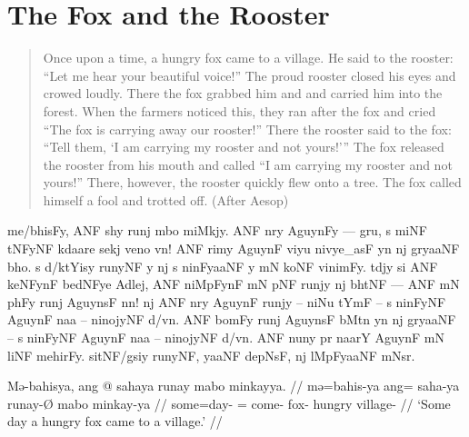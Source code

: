 \section{The Fox and the Rooster}
\label{sec:foxrooster}

\citep[Adapted from][]{becker:uebersetzungsaufgabe}\medskip

\blockquote{Once upon a time, a hungry fox came to a village. He said to the
rooster: \enquote{Let me hear your beautiful voice!} The proud rooster closed
his eyes and crowed loudly. There the fox grabbed him and and carried him into
the forest. When the farmers noticed this, they ran after the fox and cried
\enquote{The fox is carrying away our rooster!} There the rooster said to the
fox: \enquote{Tell them, \enquote{I am carrying my rooster and not yours!}} The
fox released the rooster from his mouth and called \enquote{I am carrying my
rooster and not yours!} There, however, the rooster quickly flew onto a tree.
The fox called himself a fool and trotted off. (After Aesop)}

\begin{flushleft}
\Tagati me/bhisFy, ANF shy runj mbo miMkjy. ANF nry AguynFy — gru, s
miNF tNFyNF kdaare sekj veno vn! ANF rimy AguynF viyu nivye\_asF yn nj gryaaNF
bho. s d/ktYisy runyNF y nj s ninFyaaNF y mN koNF vinimFy. tdjy si ANF keNFynF
bedNFye Adlej, ANF niMpFynF mN pNF runjy nj bhtNF — ANF mN phFy runj AguynsF
nn! nj ANF nry AguynF runjy – niNu tYmF – s ninFyNF AguynF naa – ninojyNF
d/vn. ANF bomFy runj AguynsF bMtn yn nj gryaaNF – s ninFyNF AguynF naa –
ninojyNF d/vn. ANF nuny pr naarY AguynF mN liNF mehirFy. sitNF/gsiy runyNF,
yaaNF depNsF, nj lMpFyaaNF mNsr.
\end{flushleft}

\medskip

\pex %
\a\begingl
	\gla Mə-bahisya, ang @ sahaya runay mabo minkayya. //
	\glb mə=bahis-ya ang= saha-ya runay-Ø mabo minkay-ya //
	\glc some=day-\Loc{} \AgtT{}= come-\TsgM{} fox-\Top{} hungry
		village-\Loc{} //
	\glft `Some day a hungry fox came to a village.' //
\endgl


